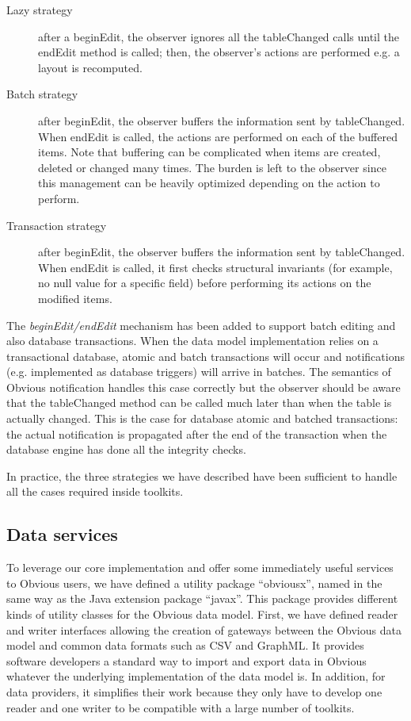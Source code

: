 \begin{description}
\item[Lazy strategy] after a beginEdit, the observer ignores all the
  tableChanged calls until the endEdit method is called; then, the
  observer's actions are performed e.g. a layout is recomputed.

\item[Batch strategy] after beginEdit, the observer buffers the
  information sent by tableChanged.  When endEdit is called, the
  actions are performed on each of the buffered items.  Note that 
  buffering can be complicated when items are created, deleted or
  changed many times.  The burden is left to the observer since this
  management can be heavily optimized depending on the action to
  perform.

\item[Transaction strategy] after beginEdit, the observer buffers the
  information sent by tableChanged.  When endEdit is called, it first
  checks structural invariants (for example, no null value for a
  specific field) before performing its actions on the modified items.
\end{description}

The \emph{beginEdit/endEdit} mechanism has been added to support batch
editing and also database transactions.  When the data model
implementation relies on a transactional database, atomic and batch
transactions will occur and notifications (e.g. implemented as
database triggers) will arrive in batches.  The semantics of Obvious
notification handles this case correctly but the observer should be
aware that the tableChanged method can be called much later than when
the table is actually changed.  This is the case for database atomic
and batched transactions: the actual notification is propagated after
the end of the transaction when the database engine has done all the
integrity checks.

In practice, the three strategies we have described have been
sufficient to handle all the cases required inside toolkits.


\subsection{Data services}

To leverage our core implementation and offer some immediately useful
services to Obvious users, we have defined a utility package
``obviousx'', named in the same way as the Java extension package
``javax''.  This package provides different kinds of utility classes
for the Obvious data model.  First, we have defined reader and writer
interfaces allowing the creation of gateways between the Obvious data
model and common data formats such as CSV and GraphML.  It provides
software developers a standard way to import and export data in
Obvious whatever the underlying implementation of the data model
is.  In addition, for data providers, it simplifies their work because
they only have to develop one reader and one writer to be compatible
with a large number of toolkits.

